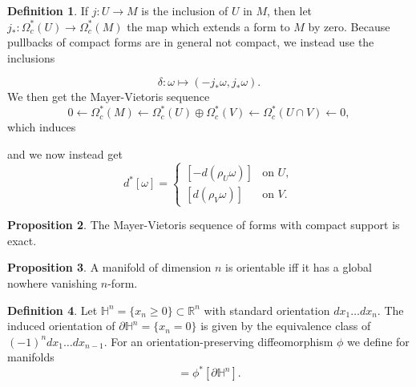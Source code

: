 \documentclass[twocolumn]{article}
\theoremstyle{definition}
\newtheorem{definition}{Definition}[section]
\newtheorem{proposition}[definition]{Proposition}
\theoremstyle{remark}
\begin{document}
\begin{definition}
    If $j: U \rightarrow M$ is the inclusion of $U$ in $M$, then let $j_*: \Omega^*_c(U) \rightarrow \Omega^*_c(M)$ the map which extends a form to $M$ by zero.
    Because pullbacks of compact forms are in general not compact, we instead use the inclusions
    \begin{center}
    \end{center}
    \begin{equation}
        \delta: \omega \mapsto (-j_*\omega, j_*\omega).
    \end{equation}
    We then get the Mayer-Vietoris sequence
    \begin{equation}
        0 \leftarrow \Omega^*_c(M) \leftarrow \Omega^*_c(U) \oplus \Omega^*_c(V) \leftarrow \Omega^*_c(U \cap V) \leftarrow 0,
    \end{equation}
    which induces
    \begin{center}
    \end{center}
    and we now instead get
    \begin{equation}
        d^*[\omega] = 
        \begin{cases}
            [-d(\rho_U\omega)] & \textrm{on } U,\\
            [d(\rho_V\omega)] & \textrm{on } V.
        \end{cases}
    \end{equation}
\end{definition}
\begin{proposition}
    The Mayer-Vietoris sequence of forms with compact support is exact.
\end{proposition}
\begin{proposition}
    A manifold of dimension $n$ is orientable iff it has a global nowhere vanishing $n$-form.
\end{proposition}
\begin{definition}
    Let $\mathbb{H}^n = \{x_n \geq 0 \} \subset \mathbb{R}^n$ with standard orientation $dx_1\dots dx_n$.
    The induced orientation of $\partial \mathbb{H}^n = \{x_n=0\}$ is given by the equivalence class of $(-1)^n dx_1 \dots dx_{n-1}$.
    For an orientation-preserving diffeomorphism $\phi$ we define for manifolds
    \begin{equation}
        [\partial M] = \phi^*[\partial \mathbb{H}^n].
    \end{equation}
\end{definition}
\end{document}
